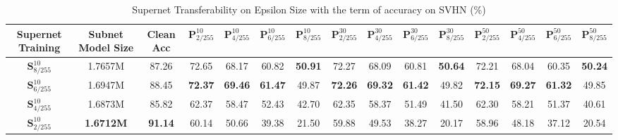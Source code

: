 \documentclass[journal]{IEEEtran}
\begin{document}
\begin{table*}[ht]
    \centering
    \setlength{\tabcolsep}{0.5mm}
    \caption{Supernet Transferability on Epsilon Size with the term of accuracy on SVHN (\%)}
    \begin{tabular}{c|c|c|cccccccccccc}
    Supernet Training& Subnet Model Size & Clean Acc & $\textbf{P}_{2/255}^{10}$ & $\textbf{P}_{4/255}^{10}$ & $\textbf{P}_{6/255}^{10}$ & $\textbf{P}_{8/255}^{10}$ & $\textbf{P}_{2/255}^{30}$ & $\textbf{P}_{4/255}^{30}$ & $\textbf{P}_{6/255}^{30}$ & $\textbf{P}_{8/255}^{30}$ & $\textbf{P}_{2/255}^{50}$ & $\textbf{P}_{4/255}^{50}$ & $\textbf{P}_{6/255}^{50}$ & $\textbf{P}_{8/255}^{50}$\\
    \hline
    $\textbf{S}_{8/255}^{10}$ & 1.7657M & 87.26 & 72.65 & 68.17 & 60.82 & \textbf{50.91} & 72.27 & 68.09 & 60.81 & \textbf{50.64} & 72.21 & 68.04 & 60.35 & \textbf{50.24} \\
    \hline
    $\textbf{S}_{6/255}^{10}$ & 1.6947M & 88.45 & \textbf{72.37} & \textbf{69.46} & \textbf{61.47} & 49.87 & \textbf{72.26} & \textbf{69.32} & \textbf{61.42} & 49.82 & \textbf{72.15} & \textbf{69.27} & \textbf{61.32}  & 49.85 \\
    \hline
    $\textbf{S}_{4/255}^{10}$ & 1.6873M & 85.82 & 62.37 & 58.47 & 52.43 & 42.70 & 62.35 & 58.37 & 51.49 & 41.50 & 62.30 & 58.21 & 51.37 & 40.61 \\
    \hline
    $\textbf{S}_{2/255}^{10}$ & \textbf{1.6712M} & \textbf{91.14} & 60.14 & 50.66 & 39.38 & 21.50 & 59.88 & 49.53 & 38.27 & 20.17 & 58.96 & 48.18 & 37.12 & 20.54 \\
    \hline
    \end{tabular}\label{tab:supernet_transferability_epsilon_size_svhn}
\end{table*}
\end{document}
